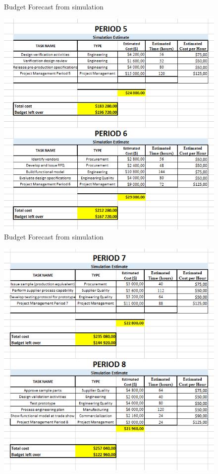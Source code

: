 \begin{appendices}
\begin{figure}[H]
\caption{Budget Forecast from simulation}
\end{figure}
\begin{figure}[H]
\includegraphics[scale=1]{budget_forecast_sim_56.PNG}
\caption{Budget Forecast from simulation}
\end{figure}
\begin{figure}[H]
\includegraphics[scale=1]{budget_forecast_sim_78.PNG}

\end{figure}
\end{appendices}
